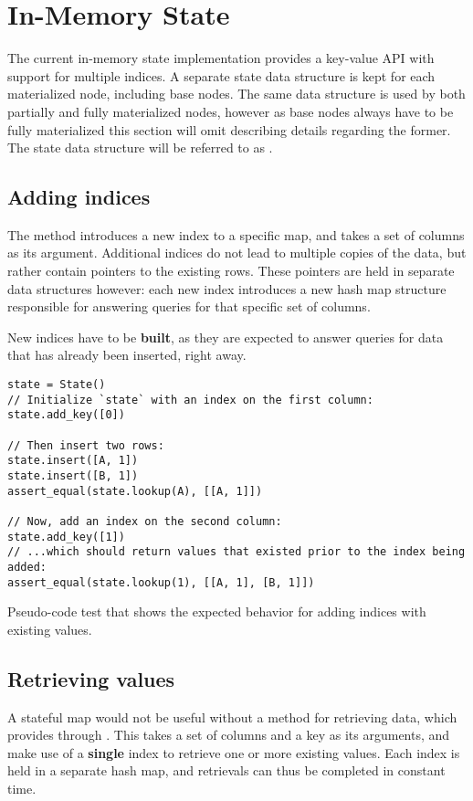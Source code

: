 \section{In-Memory State}
The current in-memory state implementation provides a key-value API with support
for multiple indices. A separate state data structure is kept for each
materialized node, including base nodes. The same data structure is used by both
partially and fully materialized nodes, however as base nodes always have to be
fully materialized this section will omit describing details regarding the
former. The state data structure will be referred to as .

\subsection{Adding indices}
The  method introduces a new index to a specific  map,
and takes a set of columns as its argument. Additional indices do not lead to
multiple copies of the data, but rather contain pointers to the existing rows.
These pointers are held in separate data structures however: each new index
introduces a new hash map structure responsible for answering queries for that
specific set of columns.

New indices have to be \textbf{built}, as they are expected to answer queries
for data that has already been inserted, right away.

\begin{listing}[H]\label{lst:existing-index}
  \begin{verbatim}
state = State()
// Initialize `state` with an index on the first column:
state.add_key([0])

// Then insert two rows:
state.insert([A, 1])
state.insert([B, 1])
assert_equal(state.lookup(A), [[A, 1]])

// Now, add an index on the second column:
state.add_key([1])
// ...which should return values that existed prior to the index being added:
assert_equal(state.lookup(1), [[A, 1], [B, 1]])
  \end{verbatim}

  \caption{Pseudo-code test that shows the expected behavior for adding indices
  with existing values.}
\end{listing}

\subsection{Retrieving values}
A stateful map would not be useful without a method for retrieving data, which
 provides through . This takes a set of columns
and a key as its arguments, and make use of a \textbf{single} index to retrieve
one or more existing values. Each index is held in a separate hash map, and
retrievals can thus be completed in constant time.

